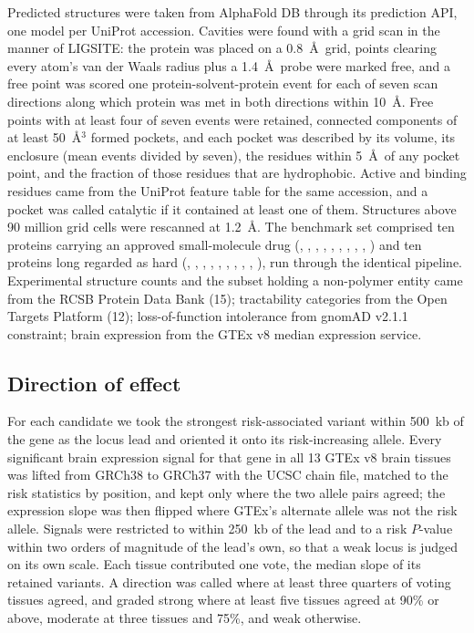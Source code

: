 \documentclass[10pt]{article}
\begin{document}
Predicted structures were taken from AlphaFold DB through its prediction API, one model per
UniProt accession. Cavities were found with a grid scan in the manner of LIGSITE: the protein was
placed on a 0.8~\AA\ grid, points clearing every atom's van der Waals radius plus a 1.4~\AA\ probe
were marked free, and a free point was scored one protein-solvent-protein event for each of seven
scan directions along which protein was met in both directions within 10~\AA. Free points with at
least four of seven events were retained, connected components of at least 50~\AA$^3$ formed
pockets, and each pocket was described by its volume, its enclosure (mean events divided by seven),
the residues within 5~\AA\ of any pocket point, and the fraction of those residues that are
hydrophobic. Active and binding residues came from the UniProt feature table for the same
accession, and a pocket was called catalytic if it contained at least one of them. Structures
above 90 million grid cells were rescanned at 1.2~\AA. The benchmark set comprised ten proteins
carrying an approved small-molecule drug (, , , ,
, , , , , ) and ten proteins
long regarded as hard (, , , , ,
, , , , ), run through the identical
pipeline. Experimental structure counts and the subset holding a non-polymer entity came from the RCSB Protein Data Bank (15); tractability categories from the Open Targets Platform (12); loss-of-function
intolerance from gnomAD v2.1.1 constraint; brain expression from the GTEx v8 median expression
service.

\subsection*{Direction of effect}

For each candidate we took the strongest risk-associated variant within 500~kb of the gene as the
locus lead and oriented it onto its risk-increasing allele. Every significant brain expression
signal for that gene in all 13 GTEx v8 brain tissues was lifted from GRCh38 to GRCh37 with the
UCSC chain file, matched to the risk statistics by position, and kept only where the two allele
pairs agreed; the expression slope was then flipped where GTEx's alternate allele was not the risk
allele. Signals were restricted to within 250~kb of the lead and to a risk $P$-value within two
orders of magnitude of the lead's own, so that a weak locus is judged on its own scale. Each
tissue contributed one vote, the median slope of its retained variants. A direction was called
where at least three quarters of voting tissues agreed, and graded strong where at least five
tissues agreed at 90\% or above, moderate at three tissues and 75\%, and weak otherwise.
\end{document}
